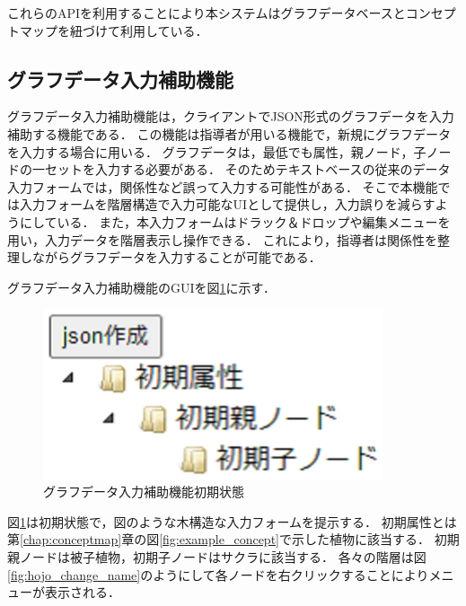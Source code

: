 これらのAPIを利用することにより本システムはグラフデータベースとコンセプトマップを紐づけて利用している．
\newpage

\subsection{グラフデータ入力補助機能}\label{subsec:hojo}
グラフデータ入力補助機能は，クライアントでJSON形式のグラフデータを入力補助する機能である．
この機能は指導者が用いる機能で，新規にグラフデータを入力する場合に用いる．
グラフデータは，最低でも属性，親ノード，子ノードの一セットを入力する必要がある．
そのためテキストベースの従来のデータ入力フォームでは，関係性など誤って入力する可能性がある．
そこで本機能では入力フォームを階層構造で入力可能なUIとして提供し，入力誤りを減らすようにしている．
また，本入力フォームはドラック＆ドロップや編集メニューを用い，入力データを階層表示し操作できる．
これにより，指導者は関係性を整理しながらグラフデータを入力することが可能である．

グラフデータ入力補助機能のGUIを図\ref{fig:hojo}に示す．

\begin{figure}[htbp]
\begin{center}
\includegraphics[width=10cm]{img/hojo.eps}
\end{center}
\caption{グラフデータ入力補助機能初期状態}
\label{fig:hojo}
\end{figure}

図\ref{fig:hojo}は初期状態で，図のような木構造な入力フォームを提示する．
初期属性とは第\ref{chap:conceptmap}章の図\ref{fig:example_concept}で示した植物に該当する．
初期親ノードは被子植物，初期子ノードはサクラに該当する．
\newpage
各々の階層は図\ref{fig:hojo_change_name}のようにして各ノードを右クリックすることによりメニューが表示される．

